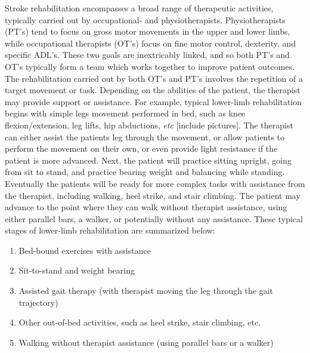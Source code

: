 \documentclass[12pt]{report}
\begin{document}

Stroke rehabilitation encompasses a broad range of therapeutic activities, typically carried out by occupational- and physiotherapists. Physiotherapists (PT's) tend to focus on gross motor movements in the upper and lower limbs, while occupational therapists (OT's) focus on fine motor control, dexterity, and specific ADL's. These two goals are inextricably linked, and so both PT's and OT's typically form a team which works together to improve patient outcomes. The rehabilitation carried out by both OT's and PT's involves the repetition of a target movement or task. Depending on the abilities of the patient, the therapist may provide support or assistance. For example, typical lower-limb rehabilitation begins with simple legs movement performed in bed, such as knee flexion/extension, leg lifts, hip abductions, \textit{etc} [include pictures]. The therapist can either assist the patients leg through the movement, or allow patients to perform the movement on their own, or even provide light resistance if the patient is more advanced. Next, the patient will practice sitting upright, going from sit to stand, and  practice bearing weight and balancing while standing. Eventually the patients will be ready for more complex tasks with assistance from the therapist, including walking, heel strike, and stair climbing. The patient may advance to the point where they can walk without therapist assistance, using either parallel bars, a walker, or potentially without any assistance. These typical stages of lower-limb rehabilitation are summarized below:

\begin{enumerate}
	\item Bed-bound exercises with assistance
	\item Sit-to-stand and weight bearing
	\item Assisted gait therapy (with therapist moving the leg through the gait trajectory)
	\item Other out-of-bed activities, such as heel strike, stair climbing, etc.
	\item Walking without therapist assistance (using parallel bars or a walker)
\end{enumerate}
\end{document}
